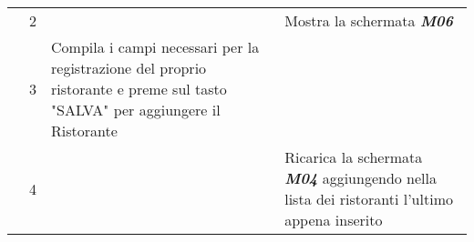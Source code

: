 \begin{table}[H]
\begin{tabularx}{\linewidth}{|l|X|X|X|}
          \cline{2-4} &{2} & {} & {Mostra la schermata \textbf{\textit{M06}}} \\
          
          \cline{2-4} &{3} & {Compila i campi necessari per la registrazione del proprio ristorante e preme sul tasto "SALVA" per aggiungere il Ristorante} & \\
          
          \cline{2-4} &{4} & & {Ricarica la schermata \textbf{\textit{M04}} aggiungendo nella lista dei ristoranti l'ultimo appena inserito} \\
    
      \hline


    
    \end{tabularx}
    
    \end{table}
    
